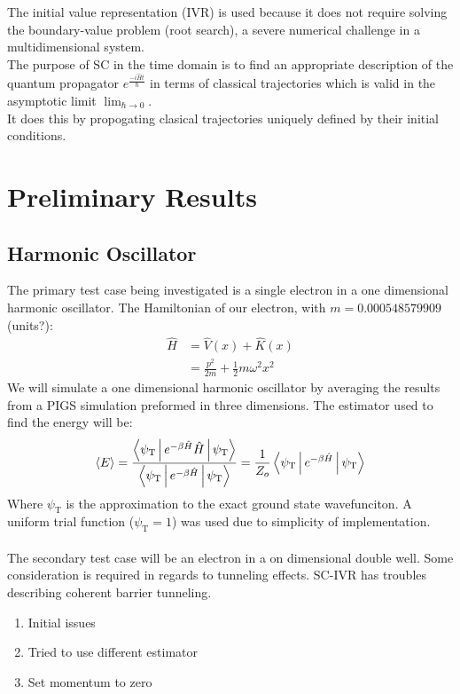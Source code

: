 \documentclass[12pt,letterpaper,oneside,final,titlepage]{article}               %
\numberwithin{equation}{section} %
\newcommand{\psiT}{\psi_{\textrm{T}}}
\newcommand{\eBH}{e^{-\beta\hat{H}}}
\newcommand{\emiHt}{e^{\frac{-i\hat{H}t}{\hbar}}}
\begin{document}
\begin{enumerate}
    The initial value representation (IVR) is used because it does not require solving the boundary-value problem (root search), a severe numerical challenge in a multidimensional system. \\
    The purpose of SC in the time domain is to find an appropriate description of the quantum propagator $\emiHt$ 
    in terms of classical trajectories which is valid in the asymptotic limit $\lim_{\hbar \to 0}$. \\
    It does this by propogating clasical trajectories uniquely defined by their initial conditions.
\end{enumerate}


\section{Preliminary Results}

\subsection*{Harmonic Oscillator}
The primary test case being investigated is a single electron in a one dimensional harmonic oscillator. 
The Hamiltonian of our electron, with $m = \num{0.000548579909}$ (units?): 
\begin{align}
    \hat{H} &= \hat{V}(x) + \hat{K}(x) \\
            &= \frac{p^2}{2m} + \frac{1}{2} m \omega^{2} x^{2} 
\end{align}
We will simulate a one dimensional harmonic oscillator by averaging the results from a PIGS simulation preformed in three dimensions. 
The estimator used to find the energy will be:
\begin{equation}
    \Braket{E} = \frac{\Braket{\psiT|\eBH\hat{H}|\psiT}}{\Braket{\psiT|\eBH|\psiT}} = \frac{1}{Z_{o}} \Braket{\psiT|\eBH|\psiT}
\end{equation}
Where $\psiT$ is the approximation to the exact ground state wavefunciton. A uniform trial function ($\psiT = 1$) was used due to simplicity of implementation.
\\ \\
The secondary test case will be an electron in a on dimensional double well. Some consideration is required in regards to tunneling effects. SC-IVR has troubles describing coherent barrier tunneling.

\begin{enumerate}
    \item Initial issues
    \item Tried to use different estimator
    \item Set momentum to zero
\end{enumerate}
\end{document}
